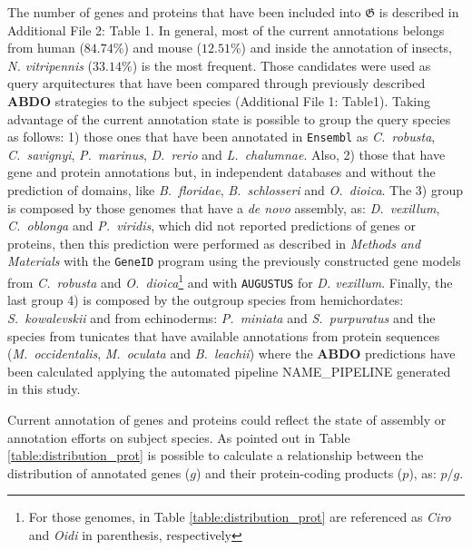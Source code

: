 \documentclass[11pt]{article}
\newcommand{\TODO}[1]{\begingroup\color{red}#1\endgroup}
\begin{document}
The number of genes and proteins that have been included into $\boldsymbol{\mathfrak{G}}$ 
is described in Additional File 2: Table 1. In general, most of the current 
annotations belongs from human ($84.74$\%) and mouse ($12.51$\%) and inside the 
annotation of insects, \textit{N. vitripennis} ($33.14$\%) is the most frequent. 
Those candidates were used as query arquitectures that have been compared through previously 
described \textbf{ABDO} strategies to the subject species (Additional File 1: Table1). 
Taking advantage of the current annotation state is possible to group the query 
species as follows: 1) those ones that have been annotated in \texttt{Ensembl} as
\textit{C.\ robusta}, \textit{C.\ savignyi}, \textit{P.\ marinus}, \textit{D.\ 
rerio} and \textit{L.\ chalumnae}. Also, 2) those that have gene and protein annotations 
but, in independent databases and without the prediction of domains, like \textit{B.\ floridae}, 
\textit{B.\ schlosseri} and \textit{O.\ dioica}. The 3) group is composed by those 
genomes that have a \textsl{de novo} assembly, as: \textit{D.\ vexillum}, \textit{C.\ oblonga} and 
\textit{P.\ viridis}, which did not reported predictions of genes or proteins, then this 
prediction were performed as described in \textsl{Methods and Materials} with the 
\texttt{GeneID} program using the previously constructed gene models from 
\textit{C.\ robusta} and \textit{O.\ dioica}\footnote{For those genomes, in Table 
\ref{table:distribution_prot} are referenced as \textsl{Ciro} and \textsl{Oidi} in parenthesis,
respectively} and with \texttt{AUGUSTUS} for \textit{D. vexillum}. Finally, the last group 4)
is composed by the outgroup species from hemichordates: \textit{S.\ kowalevskii} and from 
echinoderms: \textit{P.\ miniata} and \textit{S.\ purpuratus} and the species from 
tunicates that have available annotations from protein sequences (\textit{M.\ occidentalis}, 
\textit{M.\ oculata} and \textit{B.\ leachii}) where the \textbf{ABDO} predictions have 
been calculated applying the automated pipeline \TODO{NAME\_PIPELINE} generated in this study.

Current annotation of genes and proteins could reflect the state of assembly
or annotation efforts on subject species. As pointed out in Table \ref{table:distribution_prot}
is possible to calculate a relationship between the distribution of annotated genes ($g$) and 
their protein-coding products ($p$), as:
$p/g$. 
\end{document}
